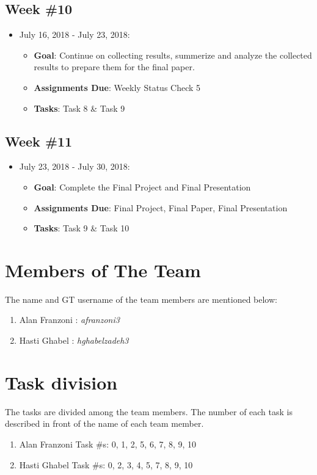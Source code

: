 \documentclass{sigchi}
\begin{document}
 \subsection{Week \#10}
\begin{itemize}
 	\item July 16, 2018 - July 23, 2018:
	\begin{itemize}
 		\item \textbf{Goal}: Continue on collecting results, summerize and analyze the collected results to prepare them for the final paper. 
 		\item \textbf{Assignments Due}: Weekly Status Check 5
 		\item \textbf{Tasks}: Task 8 \& Task 9
	\end{itemize} 
 \end{itemize} 
 
 \subsection{Week \#11}
\begin{itemize}
 	\item July 23, 2018 - July 30, 2018:
	\begin{itemize}
 		\item \textbf{Goal}: Complete the Final Project and Final Presentation
 		\item \textbf{Assignments Due}: Final Project, Final Paper, Final Presentation
 		\item \textbf{Tasks}: Task 9 \& Task 10
	\end{itemize} 
 \end{itemize} 


\section{Members of The Team}
The name and GT username of the team members are mentioned below:
 
\begin{enumerate}
	\item Alan Franzoni : \textit{afranzoni3}
	\item Hasti Ghabel : \textit{hghabelzadeh3}
\end{enumerate}


\section{Task division}
The tasks are divided among the team members. The number of each task is described in front of the name of each team member.
 
\begin{enumerate}
	\item Alan Franzoni Task \#s: 0, 1, 2, 5, 6, 7, 8, 9, 10
	\item Hasti Ghabel Task \#s: 0, 2, 3, 4, 5, 7, 8, 9, 10
\end{enumerate}



\balance{}

\balance{}



\end{document}
